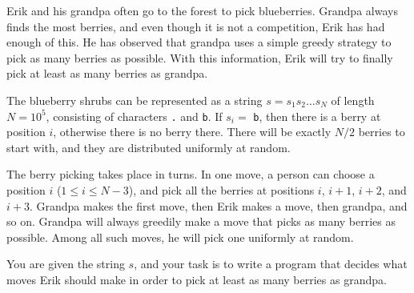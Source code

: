 

%

Erik and his grandpa often go to the forest to pick blueberries. Grandpa always finds the most berries, 
and even though it is not a competition, Erik has had enough of this. He has observed that grandpa 
uses a simple greedy strategy to pick as many berries as possible. With this information, Erik will try to 
finally pick at least as many berries as grandpa.

The blueberry shrubs can be represented as a string $s = s_1s_2 \dots s_N$ of length $N = 10^5$, consisting of characters 
\verb|.| and \verb|b|. If $s_i =$ \verb|b|, then there is a berry at position $i$, otherwise there is no 
berry there. There will be exactly $N/2$ berries to start with, and they are distributed uniformly at 
random.

The berry picking takes place in turns. In one move, a person can choose a position $i$ ($1 \leq i \leq N-3$),
and pick all the berries at positions $i$, $i+1$, $i+2$, and $i+3$. Grandpa makes the first move, then Erik makes 
a move, then grandpa, and so on. Grandpa will always greedily make a move that picks as many berries as possible.
Among all such moves, he will pick one uniformly at random.

You are given the string $s$, and your task is to write a program that decides what moves Erik should make 
in order to pick at least as many berries as grandpa.

